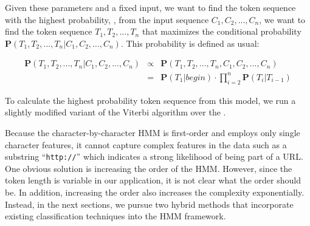 Given these parameters and a fixed input, we want to find the token
sequence with the highest probability, \ie{}, from the input sequence 
$C_1, C_2, ..., C_n$, we want to find the token sequence 
$T_1, T_2, ..., T_n$ 
that maximizes the conditional probability
$\mathbf{P}(T_1, T_2, ..., T_n|C_1, C_2, ..., C_n)$.
This probability is defined as usual:

\begin{eqnarray}
\mathbf{P}(T_1, T_2, ..., T_n|C_1, C_2, ..., C_n) & \propto & \mathbf{P}(T_1, T_2, ..., T_n, C_1, C_2, ..., C_n) \nonumber \\
& = & \mathbf{P}(T_1|begin) \cdot
\prod_{i=2}^{n}{\mathbf{P}(T_i|T_{i-1})}
\end{eqnarray}

To calculate the highest probability token sequence from this
model, we run a slightly modified variant of the Viterbi 
algorithm over the \seqset.

Because the character-by-character HMM is first-order and employs only 
single character features, it cannot capture complex features
in the data such as  
a substring ``{\tt http://}'' which indicates a strong likelihood 
of being part of a URL.
One obvious solution is increasing the order of the HMM.  However, since
the token length is variable in our application, it is not clear what
the order should be.  In addition, increasing the order also increases
the complexity exponentially.  Instead, in the next sections, we pursue
two hybrid methods that incorporate existing classification techniques
into the HMM framework.

